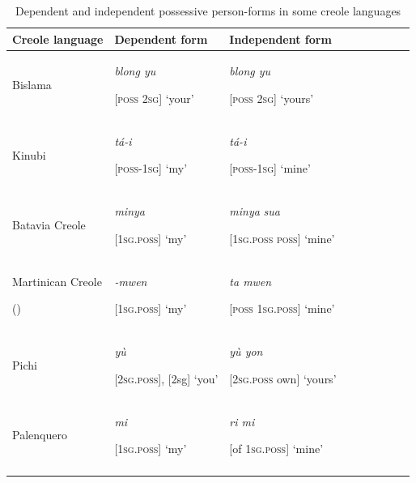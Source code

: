 \documentclass[output=paper]{langsci/langscibook}
\begin{document}
\begin{table}
\begin{tabularx}{\textwidth}{XXX}
\lsptoprule

\bfseries Creole language & \bfseries Dependent form & \bfseries Independent form\\
\midrule
Bislama

\citep{Meyerhoff2013} & \textit{blong yu}{\textit{~}}

[\textsc{poss} \textsc{2sg}] `your' & \textit{blong yu}{\textit{~}} {\textit{~ ~ ~ ~ ~ ~ ~ ~ ~ ~ ~ ~ ~}}

[\textsc{poss} \textsc{2sg}] { `}yours'\\

\tablevspace
Kinubi

\citep{Luffin2013} & \textit{tá-i}

[\textsc{poss-1sg}] `my' & \textit{tá-i}

[\textsc{poss-1sg}] `mine'\\

\tablevspace
Batavia Creole 

\citep{Maurer2013} & \textit{minya} 

[\textsc{1sg.poss}] `my' & \textit{minya}\textbf{ }\textit{sua}\textbf{ }

[\textsc{1sg.poss} \textsc{poss}] `mine'\\

\tablevspace
Martinican Creole

(\citealt{ColotLudwig2013}) & \textit{{}-mwen}

[\textsc{1sg.poss}] `my' & \textit{ta mwen}

[\textsc{poss} \textsc{1sg.poss}] `mine'\\

\tablevspace
Pichi

\citep{Yakpo2013} & \textit{yù} {\textit{~}}

[\textsc{2sg.poss}], [2sg] `you' & \textit{yù yon}

[\textsc{2sg.poss} own] `yours'\\

\tablevspace
Palenquero

\citep{Schwegler2013} & \textit{mi}

[\textsc{1sg.poss}] `my' & \textit{ri mi}

[of \textsc{1sg.poss}] `mine'\\
\lspbottomrule
\end{tabularx}

\caption{Dependent and independent possessive person-forms in some creole languages}
\label{tab:michaelis:4}
\end{table}
\end{document}

